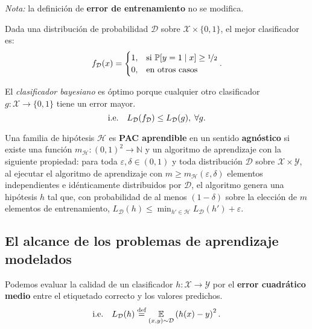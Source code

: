\documentclass[8pt,a4paper]{extarticle}
\begin{document}
\begin{multicols}{3}
\emph{Nota:} la definición de \textbf{error de entrenamiento} no se modifica.

\begin{boxdef}
	Dada una distribución de probabilidad $\mathcal{D}$ sobre $\mathcal{X} \times \{0, 1\} $, el mejor clasificador es:
	\[
		f_{\mathcal{D}}(x) = \begin{cases}
			1, & \text{\normalfont si } \mathbb{P}[y = 1  \mid x] \ge \nicefrac{1}{2} \\
			0, & \text{\normalfont en otros casos}
		\end{cases}
	.\] 
\end{boxdef}

\begin{boxrmk}[]
	El \emph{clasificador bayesiano} es óptimo porque cualquier otro clasificador $g : \mathcal{X} \to \{0,1\} $ tiene un error mayor.
	\[
		\text{\normalfont i.e.} \quad L_{\mathcal{D}}(f_{\mathcal{D}}) \le L_{\mathcal{D}}(g), \; \forall g
	.\] 
\end{boxrmk}

\begin{boxdef}
	Una familia de hipótesis $\mathcal{H}$ es \textbf{PAC aprendible} en un sentido \textbf{agnóstico} si existe una función $m_{\mathcal{H}} : (0,1)^2 \to \mathbb{N}$ y un algoritmo de aprendizaje con la siguiente propiedad: \textcolor{dred}{para toda $\varepsilon, \delta \in (0,1)$ y toda distribución $\mathcal{D}$ sobre $\mathcal{X} \times \mathcal{Y}$, al ejecutar el algoritmo de aprendizaje con $m \ge m_{\mathcal{H}} (\varepsilon, \delta)$ elementos independientes e idénticamente distribuidos por $\mathcal{D}$, el algoritmo genera una hipótesis $h$ tal que, con probabilidad de al menos  $(1 - \delta)$ sobre la elección de $m$ elementos de entrenamiento, $\displaystyle L_{\mathcal{D}} (h) \le \min_{h' \in \mathcal{H}} L_{\mathcal{D}} (h') + \varepsilon$.}
\end{boxdef}

\subsection{El alcance de los problemas de aprendizaje modelados}

\begin{boxrmk}
	Podemos evaluar la calidad de un clasificador $h : \mathcal{X} \to \mathcal{Y}$ por el \textbf{error cuadrático medio} entre el etiquetado correcto y los valores predichos.
	\[
		\text{\normalfont i.e.} \quad L_{\mathcal{D}}(h) \stackrel{\text{\normalfont def}}{=} \underset{(x,y)\sim \mathcal{D}}{\mathbb{E}} \left( h(x) - y \right)^2
	.\] 
\end{boxrmk}


\end{multicols}
\end{document}
